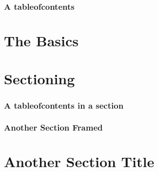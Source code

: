 \documentclass{beamer}
\begin{document}
\begin{frame}
\frametitle{A tableofcontents}
\tableofcontents
\end{frame}

\section{The Basics}

\section{Sectioning}

\begin{frame}
\frametitle{A tableofcontents in a section}
\tableofcontents
\end{frame}

\begin{frame}
\frametitle{Another Section Framed}
\section{Another Section Title}
\end{frame}
\end{document}
